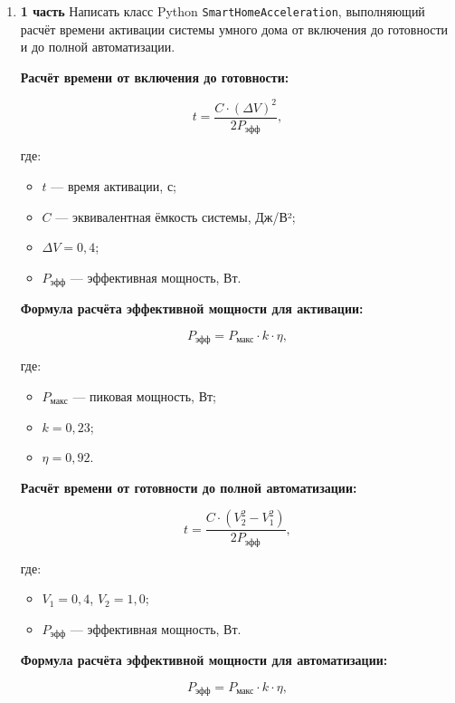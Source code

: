 \begin{enumerate}
\item[33] \textbf{1 часть}  
Написать класс Python \texttt{SmartHomeAcceleration}, выполняющий расчёт времени активации системы умного дома от включения до готовности и до полной автоматизации.

\textbf{Расчёт времени от включения до готовности:}

\begin{equation}
t = \frac{C \cdot (\Delta V)^2}{2P_{\text{эфф}}},
\end{equation}

где:  
\begin{itemize}
    \item $t$ — время активации, с;  
    \item $C$ — эквивалентная ёмкость системы, Дж/В²;  
    \item $\Delta V = 0{,}4$;  
    \item $P_{\text{эфф}}$ — эффективная мощность, Вт.  
\end{itemize}

\textbf{Формула расчёта эффективной мощности для активации:}

\begin{equation}
P_{\text{эфф}} = P_{\text{макс}} \cdot k \cdot \eta,
\end{equation}

где:  
\begin{itemize}
    \item $P_{\text{макс}}$ — пиковая мощность, Вт;  
    \item $k = 0{,}23$;  
    \item $\eta = 0{,}92$.  
\end{itemize}

\textbf{Расчёт времени от готовности до полной автоматизации:}

\begin{equation}
t = \frac{C \cdot (V_2^2 - V_1^2)}{2P_{\text{эфф}}},
\end{equation}

где:  
\begin{itemize}
    \item $V_1 = 0{,}4$, $V_2 = 1{,}0$;  
    \item $P_{\text{эфф}}$ — эффективная мощность, Вт.  
\end{itemize}

\textbf{Формула расчёта эффективной мощности для автоматизации:}

\begin{equation}
P_{\text{эфф}} = P_{\text{макс}} \cdot k \cdot \eta,
\end{equation}


\end{enumerate}
